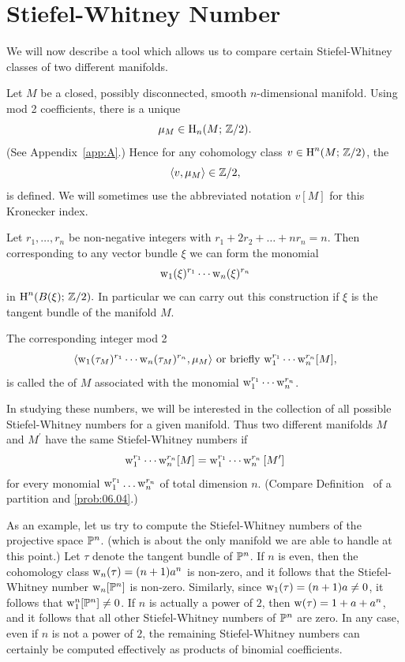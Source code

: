 \documentclass[../main]{subfiles}
\begin{document}
\section{Stiefel-Whitney Number}\label{sec:4.4}

We will now describe a tool which allows us to compare certain Stiefel-Whitney classes of two different manifolds.

Let $M$ be a closed, possibly disconnected, smooth $n$-dimensional manifold. Using mod 2 coefficients, there is a unique 
\[
\mu_{M} \in \operatorname{H}_{n}(M ; \, \mathbb{Z} / 2).
\]
(See Appendix~\ref{app:A}.) Hence for any cohomology class $v \in \operatorname{H}^{n}(M ; \, \mathbb{Z} / 2)$, the 
\[
\langle v,\mu_{M}\rangle \in \mathbb{Z} / 2,
\]
is defined. We will sometimes use the abbreviated notation $v[M]$ for this Kronecker index.

Let $r_{1}, \dots, r_{n}$ be non-negative integers with $r_{1}+2 r_{2}+\dots+n r_{n}=n$. Then corresponding to any vector bundle $\xi$ we can form the monomial
\[
\operatorname{w}_{1}(\xi)^{r_{1}} \cdots \operatorname{w}_{n}(\xi)^{r_{n}}
\]
in $\operatorname{H}^{n}(B(\xi) ;\, \mathbb{Z} / 2) .$ In particular we can carry out this construction if $\xi$ is the tangent bundle of the manifold $M$.

\begin{definition}
\label{def:04.02}
The corresponding integer mod 2
\[
\langle\operatorname{w}_{1}(\tau_{M})^{r_1} \cdots \operatorname{w}_{n}(\tau_{M})^{r_n}, \mu_{M}\rangle
\text{ or briefly }
{\operatorname{w}}_{1}^{r_1} \cdots \operatorname{w}_{n}^{r_n}[M],
\]
is called the  of $M$ associated with the monomial $\operatorname{w}_{1}^{r_{1}} \cdots \operatorname{w}_{n}^{r_n}$.
\end{definition}

In studying these numbers, we will be interested in the collection of all possible Stiefel-Whitney numbers for a given manifold. Thus two different manifolds $M$ and $M^{\prime}$ have the same Stiefel-Whitney numbers if 
\[
\operatorname{w}_{1}^{r_{1}} \cdots \operatorname{w}_{n}^{r_{n}} [M]=\operatorname{w}_{1}^{r_{1}} \cdots \operatorname{w}_{n} ^{r_n}{[M^{\prime}]}
\]
for every monomial ${\operatorname{w}}_{1}^{r_{1}} \dots \operatorname{w}_{n}^{r_n}$ of total dimension $n$. (Compare Definition~\pageref{def:06.06} of a partition and \ref{prob:06.04}.)

As an example, let us try to compute the Stiefel-Whitney numbers of the projective space $\mathbb{P}^{n}$. (which is about the only manifold we are able to handle at this point.) Let $\tau$ denote the tangent bundle of $\mathbb{P}^{n}$. If $n$ is even, then the cohomology class $\operatorname{w}_{n}(\tau)=(n+1) a^{n}$ is non-zero, and it follows that the Stiefel-Whitney number $\operatorname{w}_{n}[\mathbb{P}^{n}]$ is non-zero. Similarly, since $\operatorname{w}_{1}(\tau)=(n+1) a \neq 0$, it follows that $\operatorname{w}_{1}^{n}[\mathbb{P}^{n}] \neq 0$. If $n$ is actually a power of $2$, then $\operatorname{w}(\tau)=1+a+a^{n}$, and it follows that all other Stiefel-Whitney numbers of $\mathbb{P}^{n}$ are zero. In any case, even if $n$ is not a power of $2$, the remaining Stiefel-Whitney numbers can certainly be computed effectively as products of binomial coefficients.
\end{document}
